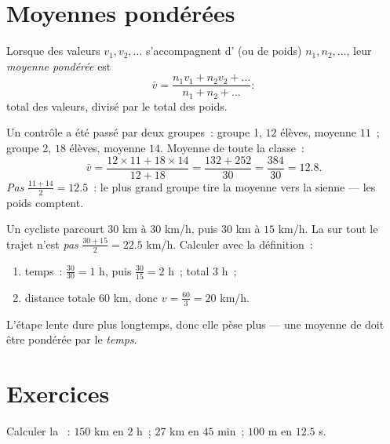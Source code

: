 \section{Moyennes pondérées}

\begin{definition}\label{def:g8:speed:average}
Lorsque des valeurs $v_1, v_2, \dots$ s'accompagnent d' (ou
de poids) $n_1, n_2, \dots$, leur \emph{moyenne
pondérée} est
\[
\bar v = \frac{n_1 v_1 + n_2 v_2 + \dots}{n_1 + n_2 + \dots} :
\]
total des valeurs, divisé par le total des poids.
\end{definition}

\begin{example}\label{ex:g8:speed:average}
Un contrôle a été passé par deux groupes~: groupe 1, $12$ élèves,
moyenne $11$~; groupe 2, $18$ élèves, moyenne $14$. Moyenne de toute
la classe~:
\[
\bar v = \frac{12 \times 11 + 18 \times 14}{12 + 18}
= \frac{132 + 252}{30} = \frac{384}{30} = 12.8 .
\]
\emph{Pas} $\frac{11 + 14}{2} = 12.5$~: le plus grand groupe tire la
moyenne vers la sienne --- les poids comptent.
\end{example}

\begin{example}\label{ex:g8:speed:twolegs}
Un cycliste parcourt $30$ km à $30$ km/h, puis $30$ km à $15$ km/h. La
 sur tout le trajet n'est \emph{pas}
$\frac{30 + 15}{2} = 22.5$ km/h. Calculer avec la définition~:
\begin{enumerate}
  \item temps~: $\frac{30}{30} = 1$ h, puis $\frac{30}{15} = 2$ h~;
        total $3$ h~;
  \item distance totale $60$ km, donc
        $v = \frac{60}{3} = 20$ km/h.
\end{enumerate}
L'étape lente dure plus longtemps, donc elle pèse plus --- une moyenne
de  doit être pondérée par le \emph{temps}.
\end{example}

\section{Exercices}

\begin{exercise}[$\star$]\label{exo:g8:speed:1}
Calculer la ~: $150$ km en $2$ h~; $27$ km en $45$
min~; $100$ m en $12.5$ s.
\end{exercise}

